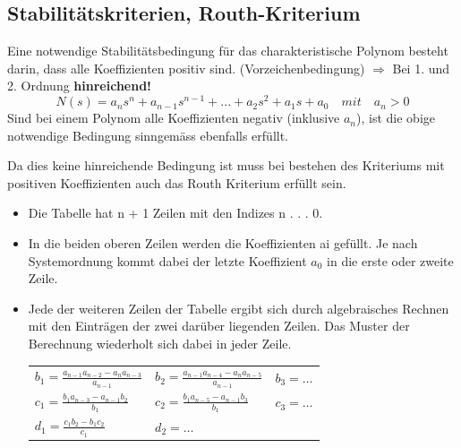 \subsection{Stabilitätskriterien, Routh-Kriterium }

Eine notwendige Stabilitätsbedingung für das charakteristische Polynom besteht darin, dass alle Koeffizienten positiv sind. (Vorzeichenbedingung) $\Rightarrow$ Bei 1. und 2. Ordnung \textbf{hinreichend!}
\begin{equation}
\boxed{N(s) = a_{n}s^n + a_{n-1}s^{n-1} + . . . + a_2s^2 + a_1s + a_0 \quad mit \quad a_n > 0}
\end{equation}
Sind bei einem Polynom alle Koeffizienten negativ (inklusive $a_n$), ist die obige
notwendige Bedingung sinngemäss ebenfalls erfüllt.



Da dies keine hinreichende Bedingung ist muss bei bestehen des Kriteriums mit positiven Koeffizienten auch das Routh Kriterium erfüllt sein.
\begin{itemize}
	\item Die Tabelle hat n + 1 Zeilen mit den Indizes n . . . 0.
	\item In die beiden oberen Zeilen werden die Koeffizienten ai gefüllt. Je nach Systemordnung
	kommt dabei der letzte Koeffizient $a_0$ in die erste oder zweite Zeile.
	
	\item {Jede der weiteren Zeilen der Tabelle ergibt sich durch algebraisches Rechnen
	mit den Einträgen der zwei darüber liegenden Zeilen. Das Muster der Berechnung
	wiederholt sich dabei in jeder Zeile.\\
	\begin{tabularx}{\textwidth}{XXX}
	$b_1=\frac{a_{n-1}a_{n-2}-a_{n}a_{n-3}}{a_{n-1}}$
	& $b_2=\frac{a_{n-1}a_{n-4}-a_{n}a_{n-5}}{a_{n-1}}$
	& $b_3=\ldots$ \\
	$c_1=\frac{b_{1}a_{n-3}-a_{n-1}b_{2}}{b_{1}}$
	& $c_2=\frac{b_{1}a_{n-5}-a_{n-1}b_{3}}{b_{1}}$
	& $c_3=\ldots$ \\
	$d_1=\frac{c_{1}b_{2}-b_{1}c_{2}}{c_{1}}$
	& $d_2=\ldots$ & \\
	\end{tabularx}}
\end{itemize}

